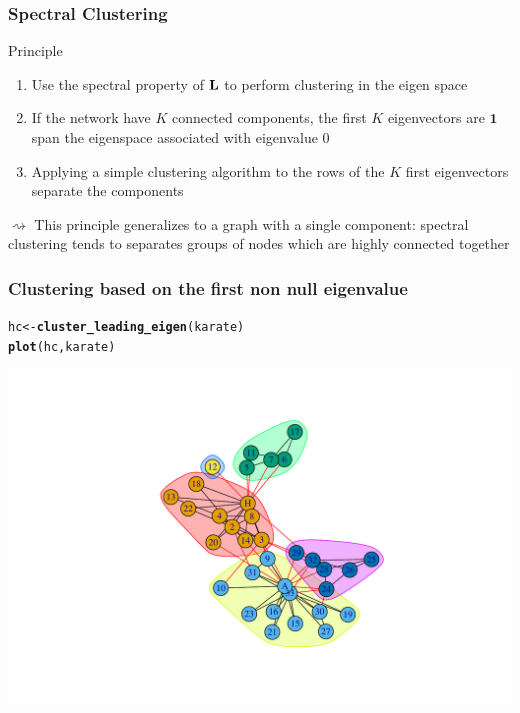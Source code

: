 \documentclass{beamer}\usepackage[]{graphicx}\usepackage[]{color}
\makeatletter
\newcommand{\hlstd}[1]{\textcolor[rgb]{0.345,0.345,0.345}{#1}}%
\newcommand{\hlkwb}[1]{\textcolor[rgb]{0.69,0.353,0.396}{#1}}%
\newcommand{\hlkwd}[1]{\textcolor[rgb]{0.737,0.353,0.396}{\textbf{#1}}}%
\newenvironment{kframe}{%
 \def\at@end@of@kframe{}%
 \ifinner\ifhmode%
  \def\at@end@of@kframe{\end{minipage}}%
  \begin{minipage}{\columnwidth}%
 \fi\fi%
 \def\FrameCommand##1{\hskip\@totalleftmargin \hskip-\fboxsep
 \colorbox{shadecolor}{##1}\hskip-\fboxsep
     \hskip-\linewidth \hskip-\@totalleftmargin \hskip\columnwidth}%
 \MakeFramed {\advance\hsize-\width
   \@totalleftmargin\z@ \linewidth\hsize
   \@setminipage}}%
 {\par\unskip\endMakeFramed%
 \at@end@of@kframe}
\newenvironment{knitrout}{}{} %
\makeatother
\begin{document}
\begin{frame}
  \frametitle{Spectral Clustering}
    
  \begin{block}{Principle}
  
  \begin{enumerate}
    \item Use the spectral property of $\mathbf{L}$ to perform clustering in the eigen space \medskip
    \item If the network have $K$ connected components, the first $K$ eigenvectors are $\mathbf{1}$ span the eigenspace associated with eigenvalue $0$ \medskip
    \item Applying a simple clustering algorithm to the rows of the $K$ first eigenvectors separate the components
  \end{enumerate}
  $\rightsquigarrow$ This principle generalizes to a graph with a single component: spectral clustering tends to separates groups of nodes which are highly connected together
  
  \end{block}
  
\end{frame}

\begin{frame}[fragile]
  \frametitle{Clustering based on the first non null eigenvalue}
  
\begin{knitrout}\scriptsize
{}\color{fgcolor}\begin{kframe}
\begin{alltt}
\hlstd{hc} \hlkwb{<-} \hlkwd{cluster_leading_eigen}\hlstd{(karate)}
\hlkwd{plot}\hlstd{(hc,karate)}
\end{alltt}
\end{kframe}
\includegraphics[width=.8\textwidth]{figures/unnamed-chunk-6-1} 

\end{knitrout}

\end{frame}
\end{document}
